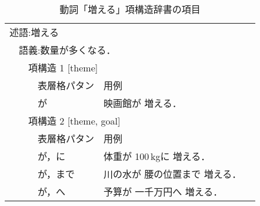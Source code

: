 \begin{table}[htbp]
\begin{center}
\caption{動詞「増える」項構造辞書の項目}
\small
\begin{tabular}{||llll|p{7cm}l||} \hline\hline
\multicolumn{5}{||l}{述語:増える} &  \\
 & \multicolumn{4}{l}{語義:数量が多くなる．} &  \\
 &  & \multicolumn{3}{l}{項構造 1 [theme]} &  \\
 &  &  & 表層格パタン & 用例 &  \\\cline{4-5}
 &  &  & が & 映画館が 増える． &  \\
 &  & \multicolumn{3}{l}{項構造 2 [theme, goal]} &  \\
 &  &  & 表層格パタン & 用例 &  \\\cline{4-5}
 &  &  & が，に & 体重が 100\,kgに 増える． &  \\
 &  &  & が，まで & 川の水が 腰の位置まで 増える． &  \\
 &  &  & が，へ & 予算が 一千万円へ 増える． &  \\\hline\hline
\end{tabular}
\label{tab:pred4}
\end{center}
\end{table}


